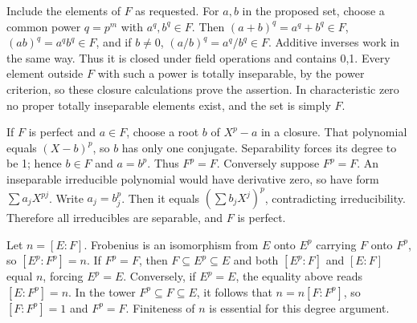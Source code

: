 Include the elements of $F$ as requested. For $a,b$ in the proposed set, choose a common power $q=p^m$ with $a^q,b^q\in F$. Then $(a+b)^q=a^q+b^q\in F$, $(ab)^q=a^qb^q\in F$, and if $b\ne0$, $(a/b)^q=a^q/b^q\in F$. Additive inverses work in the same way. Thus it is closed under field operations and contains 0,1. Every element outside $F$ with such a power is totally inseparable, by the power criterion, so these closure calculations prove the assertion. In characteristic zero no proper totally inseparable elements exist, and the set is simply $F$.

If $F$ is perfect and $a\in F$, choose a root $b$ of $X^p-a$ in a closure. That polynomial equals $(X-b)^p$, so $b$ has only one conjugate. Separability forces its degree to be 1; hence $b\in F$ and $a=b^p$. Thus $F^p=F$.
Conversely suppose $F^p=F$. An inseparable irreducible polynomial would have derivative zero, so have form $\sum a_jX^{pj}$. Write $a_j=b_j^p$. Then it equals $(\sum b_jX^j)^p$, contradicting irreducibility. Therefore all irreducibles are separable, and $F$ is perfect.

Let $n=[E:F]$. Frobenius is an isomorphism from $E$ onto $E^p$ carrying $F$ onto $F^p$, so $[E^p:F^p]=n$. If $F^p=F$, then $F\subseteq E^p\subseteq E$ and both $[E^p:F]$ and $[E:F]$ equal $n$, forcing $E^p=E$.
Conversely, if $E^p=E$, the equality above reads $[E:F^p]=n$. In the tower $F^p\subseteq F\subseteq E$, it follows that $n=n[F:F^p]$, so $[F:F^p]=1$ and $F^p=F$. Finiteness of $n$ is essential for this degree argument.
